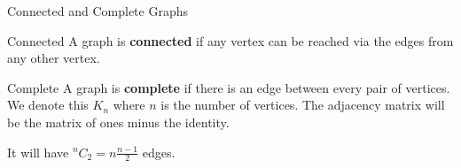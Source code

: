 \documentclass[8pt]{beamer}
\begin{document}
\begin{frame}{Connected and Complete Graphs}
	\begin{alertblock}{Connected}
		A graph is \textbf{connected} if any vertex can be reached via the edges from any other vertex.  
		
	\end{alertblock}
	\begin{alertblock}{Complete}
		A graph is \textbf{complete} if there is an edge between every pair of vertices. We denote this $K_n$ where  $n$ is the number of vertices. The adjacency matrix will be the matrix of ones minus the identity.

		It will have  $^n C _ 2 = n\frac{n-1}{2}$ edges.
		
	\end{alertblock}
\end{frame}
\end{document}
